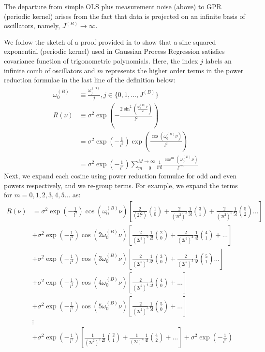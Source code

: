 The departure from simple OLS plus measurement noise (above) to GPR (periodic kernel) arises from the fact that data is projected on an infinite basis of oscillators, namely, $J^{(B)} \to \infty$.

We follow the sketch of a proof provided in \cite{solin2014explicit} to show that a sine squared exponential (periodic kernel) used in Gaussian Process Regression satisfies covariance function of trigonometric polynomials. Here, the index $j$ labels an infinite comb of oscillators and $m$ represents the higher order terms in the power reduction formulae in the last line of the definition below:
\begin{align}
\omega_0^{(B)}  &\equiv \frac{\omega_j^{(B)} }{j}, j \in \{0, 1,..., J^{(B)}\} \\
R(\nu) &\equiv \sigma^2 \exp (- \frac{2\sin^2(\frac{\omega_0^{(B)}  \nu}{2})}{l^2}) \\
&=  \sigma^2 \exp (- \frac{1}{l^2}) \exp (\frac{\cos(\omega_0^{(B)}  \nu)}{l^2}) \label{eqn:periodic_0}\\
&=  \sigma^2 \exp (- \frac{1}{l^2}) \sum_{m = 0}^{M  \to\infty} \frac{1}{m!} \frac{\cos^m(\omega_0^{(B)}  \nu)}{l^{2m}} \label{eqn:periodic_1}
\end{align}
Next, we expand each cosine using power reduction formulae for odd and even powers respectively, and we re-group terms. For example, we expand the terms for  $m = 0,1,2,3,4,5...$ as:
\begin{align}
R(\nu) &= \sigma^2 \exp (- \frac{1}{l^2}) \cos(\omega_0^{(B)}  \nu) \left[ \frac{2}{(2l^2)}\binom{1}{0} + \frac{2}{(2l^2)^3} \frac{1}{3!} \binom{3}{1} +  \frac{2}{(2l^2)^5} \frac{1}{5!}\binom{5}{2} \dots \right] \label{eqn:cosine1}\\
& + \sigma^2 \exp (- \frac{1}{l^2}) \cos(2\omega_0^{(B)}  \nu) \left[ \frac{2}{(2l^2)^2} \frac{1}{2!} \binom{2}{0} + \frac{2}{(2l^2)^4} \frac{1}{4!} \binom{4}{1} + \dots \right] \\
& + \sigma^2 \exp (- \frac{1}{l^2}) \cos(3\omega_0^{(B)}  \nu) \left[ \frac{2}{(2l^2)^3} \frac{1}{3!} \binom{3}{0} + \frac{2}{(2l^2)^5} \frac{1}{5!}\binom{5}{1} \dots \right] \\
& + \sigma^2 \exp (- \frac{1}{l^2}) \cos(4\omega_0^{(B)}  \nu) \left[ \frac{2}{(2l^2)^4} \frac{1}{4!} \binom{4}{0} + \dots \right] \\
& + \sigma^2 \exp (- \frac{1}{l^2}) \cos(5\omega_0^{(B)}  \nu) \left[ \frac{2}{(2l^2)^5} \frac{1}{5!}\binom{5}{0} + \dots \right] \label{eqn:cosine5}\\
& \vdots \nonumber \\
& + \sigma^2 \exp (- \frac{1}{l^2}) \left[ \frac{1}{(2l^2)^2} \frac{1}{2!} \binom{2}{1} + \frac{1}{(2l)^4} \frac{1}{4!} \binom{4}{2} + \dots \right] + \sigma^2 \exp (- \frac{1}{l^2}) \label{eqn:eventerms}
\end{align}
